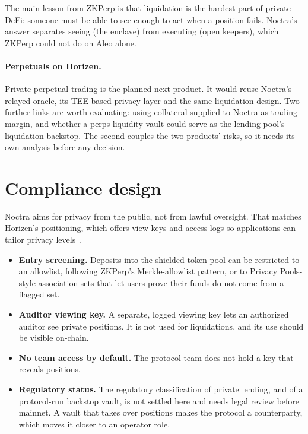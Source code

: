 \documentclass[11pt,a4paper]{article}
\begin{document}
The main lesson from ZKPerp is that liquidation is the hardest part of private DeFi: someone must be able to see
enough to act when a position fails. Noctra's answer separates seeing (the enclave) from executing (open
keepers), which ZKPerp could not do on Aleo alone.

\paragraph{Perpetuals on Horizen.} Private perpetual trading is the planned next product. It would reuse Noctra's relayed oracle, its TEE-based
privacy layer and the same liquidation design. Two further links are worth evaluating: using collateral
supplied to Noctra as trading margin, and whether a perps liquidity vault could serve as the lending pool's
liquidation backstop. The second couples the two products' risks, so it needs its own analysis before any
decision.

\section{Compliance design}
\label{sec:compliance}

Noctra aims for privacy from the public, not from lawful oversight. That matches Horizen's positioning, which
offers view keys and access logs so applications can tailor privacy levels~\citep{horizenroadmap}.

\begin{itemize}
  \item \textbf{Entry screening.} Deposits into the shielded token pool can be restricted to an allowlist,
        following ZKPerp's Merkle-allowlist pattern, or to Privacy Pools-style association sets that let users
        prove their funds do not come from a flagged set.
  \item \textbf{Auditor viewing key.} A separate, logged viewing key lets an authorized auditor see private
        positions. It is not used for liquidations, and its use should be visible on-chain.
  \item \textbf{No team access by default.} The protocol team does not hold a key that reveals positions.
  \item \textbf{Regulatory status.} The regulatory classification of private lending, and of a protocol-run
        backstop vault, is not settled here and needs legal review before mainnet. A vault that takes over
        positions makes the protocol a counterparty, which moves it closer to an operator role.
\end{itemize}
\end{document}
